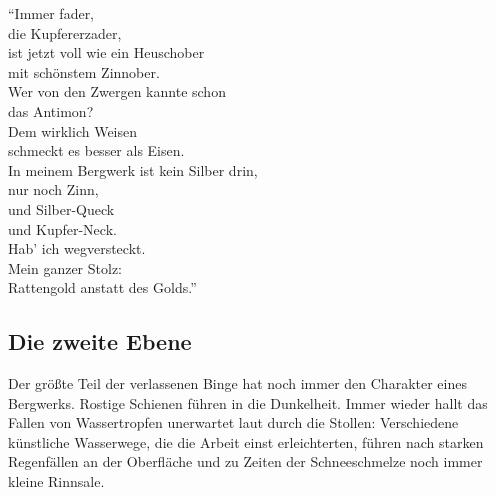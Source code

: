 
\enquote{Immer fader,\\ die Kupfererzader,\\
ist jetzt voll wie ein Heuschober\\ mit schönstem Zinnober.\\
Wer von den Zwergen kannte schon\\ das Antimon?\\
Dem wirklich Weisen\\ schmeckt es besser als Eisen.\\
In meinem Bergwerk ist kein Silber drin,\\ nur noch Zinn,\\
und Silber-Queck\\ und Kupfer-Neck.\\ Hab' ich wegversteckt.\\
Mein ganzer Stolz:\\ Rattengold anstatt des Golds.}





\subsection{Die zweite Ebene}
Der größte Teil der verlassenen Binge hat noch immer den Charakter eines Bergwerks.
Rostige Schienen führen in die Dunkelheit.
Immer wieder hallt das Fallen von Wassertropfen unerwartet laut durch die Stollen:
Verschiedene künstliche Wasserwege, die die Arbeit einst erleichterten, führen nach starken Regenfällen an der Oberfläche und zu Zeiten der Schneeschmelze noch immer kleine Rinnsale.

